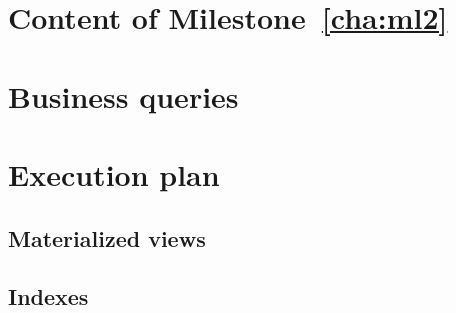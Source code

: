     \section{Content of Milestone~\ref{cha:ml2}} 
        \label{sec:ml2_content}
    

    \section{Business queries} \label{sec:ml2_queries}
    
    
    \section{Execution plan} %
    \label{sec:exec_plan}
    
    \subsection{Materialized views} \label{sub:ml2_views}
    
    \clearpage
    \subsection{Indexes} \label{sub:ml2_indexes}
    
    





